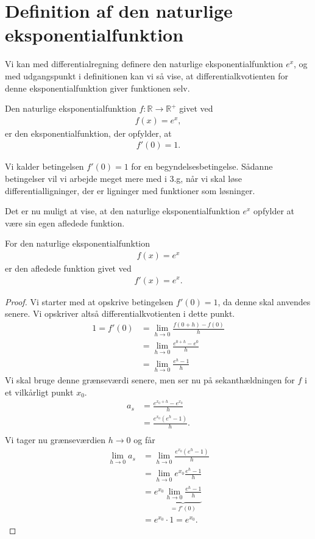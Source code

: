 \section*{Definition af den naturlige eksponentialfunktion}
Vi kan med differentialregning definere den naturlige eksponentialfunktion $e^x$, og med udgangspunkt i definitionen kan vi så vise, at differentialkvotienten for denne eksponentialfunktion giver funktionen selv.
\begin{defn}
	Den naturlige eksponentialfunktion $f: \mathbb{R} \to \mathbb{R}^+$ givet ved
	\begin{align*}
		f(x) = e^x,	
	\end{align*}	
	er den eksponentialfunktion, der opfylder, at
	\begin{align*}
		f'(0) = 1.
	\end{align*}
\end{defn}
Vi kalder betingelsen $f'(0) = 1$ for en begyndelsesbetingelse. Sådanne betingelser vil vi arbejde meget mere med i 3.g, når vi skal løse differentialligninger, der er ligninger med funktioner som løsninger. 

Det er nu muligt at vise, at den naturlige eksponentialfunktion $e^x$ opfylder at være sin egen afledede funktion.

\begin{setn}
	For den naturlige eksponentialfunktion
	\begin{align*}
		f(x) = e^x
	\end{align*}
	er den afledede funktion givet ved
	\begin{align*}
		f'(x ) = e^x.
	\end{align*}
\end{setn}
\begin{proof}
	Vi starter med at opskrive betingelsen $f'(0) = 1$, da denne skal anvendes senere. Vi opskriver altså 
	differentialkvotienten i dette punkt.
	\begin{align*}
		1 = f'(0) &=  \lim_{h \to 0}\frac{f(0+h)-f(0)}{h}\\
		 &= \lim_{h \to 0}\frac{e^{0+h}-e^0}{h}\\
		&= \lim_{h\to 0} \frac{e^h-1}{h}
	\end{align*}
	Vi skal bruge denne grænseværdi senere, men ser nu på sekanthældningen for $f$ i et vilkårligt punkt $x_0$. 
	\begin{align*}
		a_s &= \frac{e^{x_0+h}-e^{x_0}}{h} \\
		&= \frac{e^{x_0}\left(e^{h}-1\right)}{h}. \\
	\end{align*}
	Vi tager nu grænseværdien $h \to 0$ og får
	\begin{align*}
		\lim_{h \to 0}a_s &= \lim_{h \to 0}\frac{e^{x_0}\left(e^h-1\right)}{h} \\
		&= \lim_{h \to 0}e^{x_0}\frac{e^h-1}{h} \\
		&= e^{x_0}\underbrace{\lim_{h \to 0}\frac{e^h-1}{h}}_{= f'(0)} \\
		&= e^{x_0}\cdot 1 = e^{x_0}. 
	\end{align*}
\end{proof}
